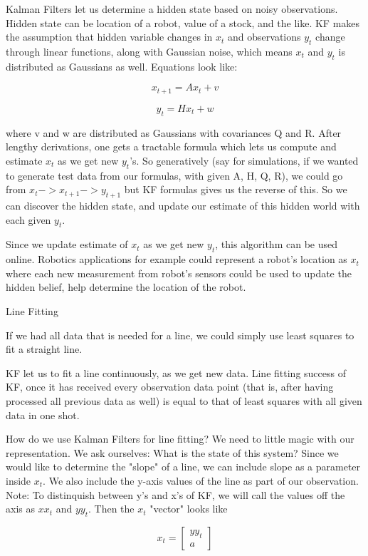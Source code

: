 \documentclass[12pt,fleqn]{article}
\begin{document}
Kalman Filters let us determine a hidden state based on noisy
observations. Hidden state can be location of a robot, value of a stock,
and the like. KF makes the assumption that hidden variable changes in $x_t$
and observations $y_t$ change through linear functions, along with Gaussian
noise, which means $x_t$ and $y_t$ is distributed as Gaussians as
well. Equations look like:

\[ x_{t+1} = Ax_t + v \]

\[ y_t = Hx_t + w \]

where v and w are distributed as Gaussians with covariances Q and R. After
lengthy derivations, one gets a tractable formula which lets us compute and
estimate $x_t$ as we get new $y_t$'s. So generatively (say for simulations, if
we wanted to generate test data from our formulas, with given A, H, Q, R),
we could go from $x_{t} -> x_{t+1} -> y_{t+1}$ but KF formulas gives us the
reverse of this. So we can discover the hidden state, and update our
estimate of this hidden world with each given $y_t$.

Since we update estimate of $x_t$ as we get new $y_t$, this algorithm
can be used online. Robotics applications for example could represent
a robot's location as $x_t$ where each new measurement from robot's
sensors could be used to update the hidden belief, help determine the
location of the robot.

Line Fitting

If we had all data that is needed for a line, we could simply use least
squares to fit a straight line.

KF let us to fit a line continuously, as we get new data. Line fitting success of KF, once it has received every observation data point (that is, after having processed all previous data as well) is equal to that of least squares with all given data in one shot.

How do we use Kalman Filters for line fitting? We need to little magic with
our representation. We ask ourselves: What is the state of this system?
Since we would like to determine the "slope" of a line, we can include
slope as a parameter inside $x_t$. We also include the y-axis values of the
line as part of our observation. Note: To distinquish between y's and x's
of KF, we will call the values off the axis as $xx_t$ and $yy_t$. Then the $x_t$
"vector" looks like

\[ 
x_t = \left[
\begin{array}{c}
yy_t \\ a
\end{array}
\right]
 \]
\end{document}
